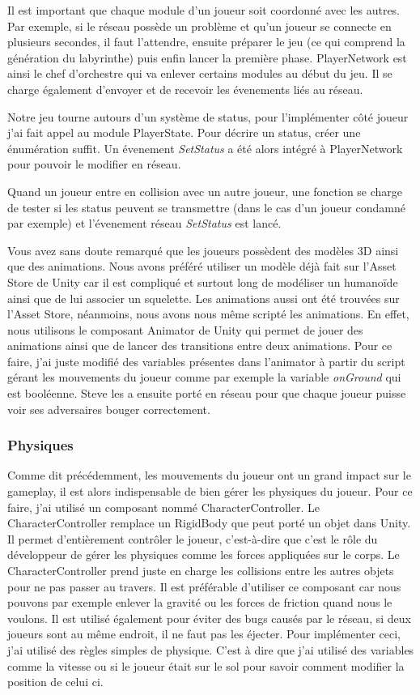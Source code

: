 \documentclass{article}
\begin{document}
Il est important que chaque module d'un joueur soit coordonné avec les autres. Par exemple, si le réseau possède un problème et qu'un joueur se connecte en plusieurs secondes, il faut l'attendre, ensuite préparer le jeu (ce qui comprend la génération du labyrinthe) puis enfin lancer la première phase. PlayerNetwork est ainsi le chef d'orchestre qui va enlever certains modules au début du jeu. Il se charge également d'envoyer et de recevoir les évenements liés au réseau.

Notre jeu tourne autours d'un système de status, pour l'implémenter côté joueur j'ai fait appel au module PlayerState.
Pour décrire un status, créer une énumération suffit. Un évenement \emph{SetStatus} a été alors intégré à PlayerNetwork pour pouvoir le modifier en réseau.

Quand un joueur entre en collision avec un autre joueur, une fonction se charge de tester si les status peuvent se transmettre (dans le cas d'un joueur condamné par exemple) et l'évenement réseau \emph{SetStatus} est lancé.

Vous avez sans doute remarqué que les joueurs possèdent des modèles 3D ainsi que des animations.
Nous avons préféré utiliser un modèle déjà fait sur l'Asset Store de Unity car il est compliqué et surtout long de modéliser un humanoïde ainsi que de lui associer un squelette. Les animations aussi ont été trouvées sur l'Asset Store, néanmoins, nous avons nous même scripté les animations. En effet, nous utilisons le composant Animator de Unity qui permet de jouer des animations ainsi que de lancer des transitions entre deux animations. Pour ce faire, j'ai juste modifié des variables présentes dans l'animator à partir du script gérant les mouvements du joueur comme par exemple la variable \emph{onGround} qui est booléenne. Steve les a ensuite porté en réseau pour que chaque joueur puisse voir ses adversaires bouger correctement.

\subsubsection{Physiques}

Comme dit précédemment, les mouvements du joueur ont un grand impact sur le gameplay, il est alors indispensable de bien gérer les physiques du joueur.
Pour ce faire, j'ai utilisé un composant nommé CharacterController. Le CharacterController remplace un RigidBody que peut porté un objet dans Unity. Il permet d'entièrement contrôler le joueur, c'est-à-dire que c'est le rôle du développeur de gérer les physiques comme les forces appliquées sur le corps. Le CharacterController prend juste en charge les collisions entre les autres objets pour ne pas passer au travers. Il est préférable d'utiliser ce composant car nous pouvons par exemple enlever la gravité ou les forces de friction quand nous le voulons. Il est utilisé également pour éviter des bugs causés par le réseau, si deux joueurs sont au même endroit, il ne faut pas les éjecter.
Pour implémenter ceci, j'ai utilisé des règles simples de physique. C'est à dire que j'ai utilisé des variables comme la vitesse ou si le joueur était sur le sol pour savoir comment modifier la position de celui ci.
\end{document}
